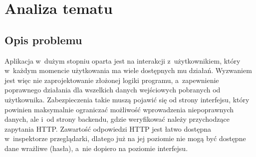\documentclass[a4paper,twoside,12pt]{book}
\newcommand{\obcy}[1]{\emph{#1}}
\newcommand{\english}[1]{{\selectlanguage{british}\obcy{#1}}}
\begin{document}




\chapter{Analiza tematu}


\section{Opis problemu}
Aplikacja w~dużym stopniu oparta jest na interakcji z~użytkownikiem, który w~każdym momencie użytkowania ma wiele dostępnych mu działań. Wyzwaniem jest więc nie zaprojektowanie złożonej logiki programu, a~zapewnienie poprawnego działania dla wszelkich danych wejściowych pobranych od użytkownika. Zabezpieczenia takie muszą pojawić się od strony interfejsu, który powinien maksymalnie ograniczać możliwość wprowadzenia niepoprawnych danych, ale i~od strony backendu, gdzie weryfikować należy przychodzące zapytania HTTP. Zawartość odpowiedzi HTTP jest łatwo dostępna w~inspektorze przeglądarki, dlatego już na jej poziomie nie mogą być dostępne dane wrażliwe (hasła), a~nie dopiero na poziomie interfejsu.
\end{document}
